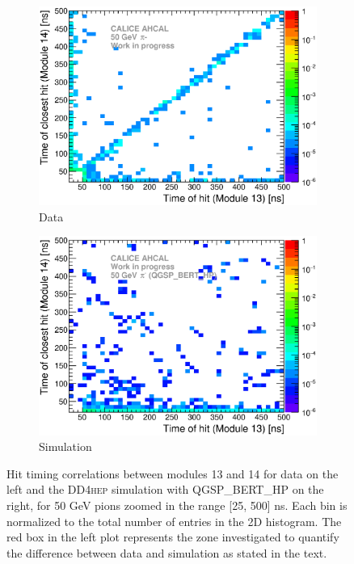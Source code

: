 \documentclass[a4paper]{article}
\newcommand\ddhep{\textsc{DD4hep}\xspace}
\begin{document}
\begin{figure}[htbp!]
  \begin{subfigure}[t]{0.49\textwidth}
    \centering
    \includegraphics[width=1\textwidth]{../Draft/fig/Time_Correlation_long_Zoom.eps}
    \caption{Data} \label{fig:TimeCorr_Data_long_50GeV_Zoom}
  \end{subfigure}
  \hfill
  \begin{subfigure}[t]{0.49\textwidth}
    \centering
    \includegraphics[width=1\textwidth]{../Draft/fig/Time_Correlation_50GeV_long_QGSPBERTHP_DD4hep_Zoom.eps}
    \caption{Simulation} \label{fig:TimeCorr_Data_long_50GeV_Sim_Zoom}
  \end{subfigure}
  \caption{Hit timing correlations between modules 13 and 14 for data on the left and the \ddhep simulation with QGSP\_BERT\_HP on the right, for 50 GeV pions zoomed in the range [25, 500] ns. Each bin is normalized to the total number of entries in the 2D histogram. The red box in the left plot represents the zone investigated to quantify the difference between data and simulation as stated in the text.}
  \label{fig:TimeCorr_long_50GeV_Zoom}
\end{figure}
\end{document}
